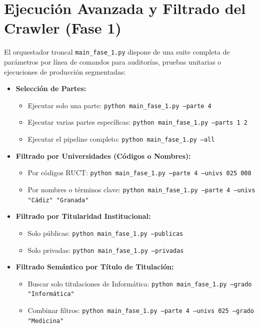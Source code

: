 \section{Ejecución Avanzada y Filtrado del Crawler (Fase 1)}
El orquestador troncal \texttt{main\_fase\_1.py} dispone de una suite completa de parámetros por línea de comandos para auditorías, pruebas unitarias o ejecuciones de producción segmentadas:
\begin{itemize}
    \item \textbf{Selección de Partes:}
    \begin{itemize}
        \item Ejecutar solo una parte: \texttt{python main\_fase\_1.py --parte 4}
        \item Ejecutar varias partes específicas: \texttt{python main\_fase\_1.py --parts 1 2}
        \item Ejecutar el pipeline completo: \texttt{python main\_fase\_1.py --all}
    \end{itemize}
    \item \textbf{Filtrado por Universidades (Códigos o Nombres):}
    \begin{itemize}
        \item Por códigos RUCT: \texttt{python main\_fase\_1.py --parte 4 --univs 025 008}
        \item Por nombres o términos clave: \texttt{python main\_fase\_1.py --parte 4 --univs "Cádiz" "Granada"}
    \end{itemize}
    \item \textbf{Filtrado por Titularidad Institucional:}
    \begin{itemize}
        \item Solo públicas: \texttt{python main\_fase\_1.py --publicas}
        \item Solo privadas: \texttt{python main\_fase\_1.py --privadas}
    \end{itemize}
    \item \textbf{Filtrado Semántico por Título de Titulación:}
    \begin{itemize}
        \item Buscar solo titulaciones de Informática: \texttt{python main\_fase\_1.py --grado "Informática"}
        \item Combinar filtros: \texttt{python main\_fase\_1.py --parte 4 --univs 025 --grado "Medicina"}
    \end{itemize}
\end{itemize}

